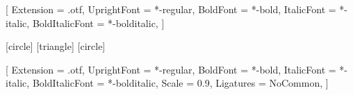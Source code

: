 
\usepackage{fontspec}
\setsansfont{texgyreheros}[
  Extension      = .otf,
  UprightFont    = *-regular,
  BoldFont       = *-bold,
  ItalicFont     = *-italic,
  BoldItalicFont = *-bolditalic,
]

[circle]
[triangle]
[circle]

\setmonofont{texgyrecursor}[
  Extension      = .otf,
  UprightFont    = *-regular,
  BoldFont       = *-bold,
  ItalicFont     = *-italic,
  BoldItalicFont = *-bolditalic,
  Scale          = 0.9,
  Ligatures      = NoCommon,
]
